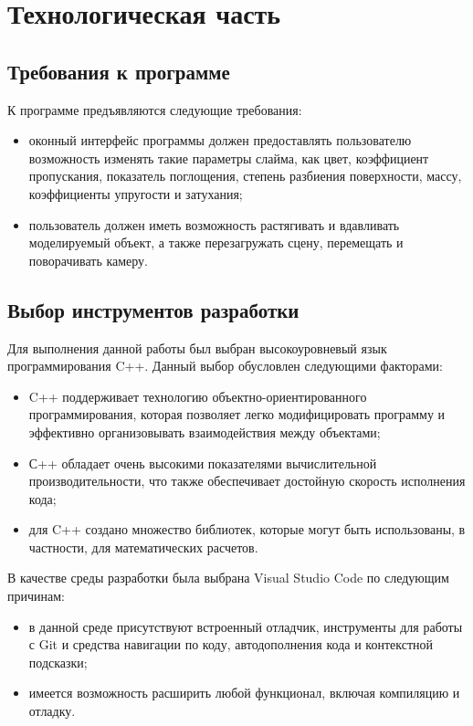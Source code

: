 \chapter{Технологическая часть}

\section{Требования к программе}

К программе предъявляются следующие требования:

\begin{itemize}
	\item оконный интерфейс программы должен предоставлять пользователю возможность изменять такие параметры слайма, как цвет, коэффициент пропускания, показатель поглощения, степень разбиения поверхности, массу, коэффициенты упругости и затухания;
	\item пользователь должен иметь возможность растягивать и вдавливать моделируемый объект, а также перезагружать сцену, перемещать и поворачивать камеру.
\end{itemize}

\section{Выбор инструментов разработки}

Для выполнения данной работы был выбран высокоуровневый язык
программирования C++. Данный выбор обусловлен следующими факторами:

\begin{itemize}
	\item C++ поддерживает технологию объектно-ориентированного
	программирования, которая позволяет легко модифицировать программу и
	эффективно организовывать взаимодействия между объектами;
	\item С++ обладает очень высокими показателями вычислительной
	производительности, что также обеспечивает достойную скорость исполнения
	кода;
	\item для C++ создано множество библиотек, которые могут быть
	использованы, в частности, для математических расчетов.
\end{itemize}

В качестве среды разработки была выбрана Visual Studio Code по
следующим причинам:

\begin{itemize}
	\item в данной среде присутствуют встроенный отладчик, инструменты для
	работы с Git и средства навигации по коду, автодополнения кода и контекстной
	подсказки;
	\item имеется возможность расширить любой функционал, включая
	компиляцию и отладку.
\end{itemize}


